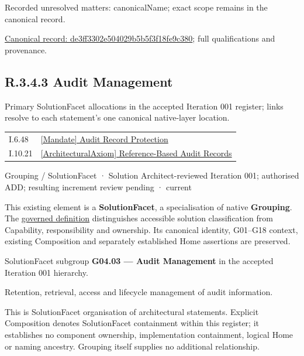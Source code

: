 {\small Recorded unresolved matters: canonicalName; exact scope remains in the canonical record.}\par
{\footnotesize \href{../../../../../../../continuum/grouping/de3ff3302e504029b5b5f3f18fe9c380.md}{Canonical record: de3ff3302e504029b5b5f3f18fe9c380}; full qualifications and provenance.}\par
\subsection*{R.3.4.3 Audit Management}
\label{navigation:R.3.4.3}

Primary SolutionFacet allocations in the accepted Iteration 001 register; links resolve to each statement’s one canonical native-layer location.\par
\begin{longtable}{p{.22\linewidth}p{.73\linewidth}}
I.6.48 & \hyperref[element:de15359269cf45adb646a435c18306f8]{[Mandate] Audit Record Protection} \\
I.10.21 & \hyperref[element:9202f9b1adf84d4882a507a2d7280710]{[ArchitecturalAxiom] Reference-Based Audit Records} \\
\end{longtable}
\label{element:de791c4976f84676bf8545b1cfb8bf41}
{\small Grouping / SolutionFacet · Solution Architect-reviewed Iteration 001; authorised ADD; resulting increment review pending · current}\par

This existing element is a \textbf{SolutionFacet}, a specialisation of native
\textbf{Grouping}. The \href{\detokenize{../../../../../../../governance/continuum-representation.md#solutionfacet-classification--1119-candidate}}{governed definition}
distinguishes accessible solution classification from Capability, responsibility
and ownership. Its canonical identity, G01–G18 context, existing Composition
and separately established Home assertions are preserved.



SolutionFacet subgroup \textbf{G04.03 — Audit Management} in the accepted Iteration 001 hierarchy.



Retention, retrieval, access and lifecycle management of audit information.



This is SolutionFacet organisation of architectural statements. Explicit Composition denotes SolutionFacet containment within this register; it establishes no component ownership, implementation containment, logical Home or naming ancestry. Grouping itself supplies no additional relationship.


